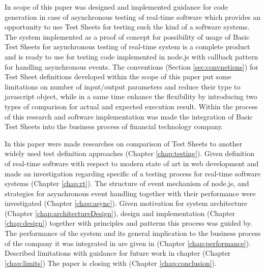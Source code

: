 In scope of this paper was designed and implemented guidance for code generation in case of asynchronous testing of real-time software which provides an opportunity to use Test Sheets for testing such the kind of a software systems. The system implemented as a proof of concept for possibility of usage of Basic Test Sheets for asynchronous testing of real-time system is a complete product and is ready to use for testing code implemented in node.js with callback pattern for handling asynchronous events. The conventions (Section \ref{sec:convnetions}) for Test Sheet definitions developed within the scope of this paper put some limitations on number of input/output parameters and reduce their type to javascript object, while in a same time enhance the flexibility by introducing two types of comparison for actual and expected execution result. Within the process of this research and software implementation was made the integration of Basic Test Sheets into the business process of financial technology company.


In this paper were made researches on comparison of Test Sheets to another widely used test definition approaches (Chapter \ref{chap:testing}). Given definition of real-time software with respect to modern state of art in web development and made an investigation regarding specific of a testing process for real-time software systems (Chapter \ref{chap:rt}). The structure of event mechanism of node.js, and strategies for asynchronous event handling together with their performance were investigated (Chapter \ref{chap:async}). Given motivation for system architecture (Chapter \ref{chap:architectureDesign}), design and implementation (Chapter \ref{chap:design}) together with principles and patterns this process was guided by. The performance of the system and its general implication to the business process of the company it was integrated in are given in (Chapter  \ref{chap:performance}). Described limitations with guidance for future work in chapter (Chapter \ref{chap:limits}) The paper is closing with (Chapter \ref{chap:conclusion}).



